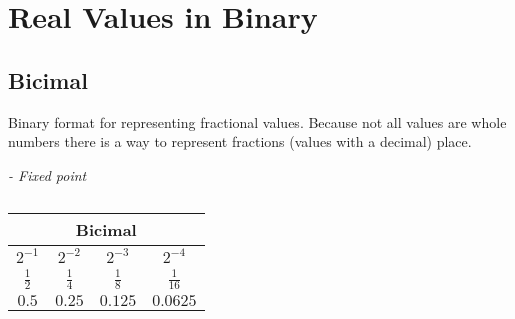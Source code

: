 \documentclass[]{book}
\author{Abdul Waajid}
\date{11th of October 2024}
\begin{document}
\section{Real Values in Binary}

\subsection{Bicimal}

Binary format for representing fractional values. Because not all values are whole numbers there is a way to represent fractions (values with a decimal)
place.


\textit{- Fixed point}

\begin{table}[H]
    \begin{center}
        \begin{tabular}{|c|c|c|c|}
            \hline
            \multicolumn{4}{|c|}{Bicimal}\\ \hline
            $2^{-1}$ & $2^{-2}$ & $2^{-3}$ & $2^{-4}$\\ \hline
            $\frac{1}{2}$ & $\frac{1}{4}$ & $\frac{1}{8}$ &  $\frac{1}{16}$\\ \hline
            $0.5$ & $0.25$ & $0.125$ & $0.0625$\\ \hline
        \end{tabular}
    \end{center}
    \caption{}
\end{table}
\end{document}
